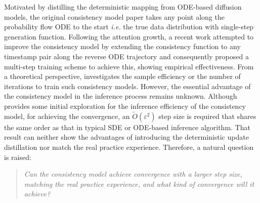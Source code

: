 \documentclass[11pt]{article}
\newcommand{\xh}[1]{\textcolor[HTML]{66CCFF}{#1}}
\begin{document}
Motivated by distilling the deterministic mapping from ODE-based diffusion models,
the original consistency model paper \cite{song2023consistency} takes any point along the probability flow ODE to the start \textit{i.e.} the true data distribution with single-step generation function.
Following the attention growth, a recent work \cite{kim2023consistency} attempted to improve the consistency model by extending the consistency function to any timestamp pair along the reverse ODE trajectory and consequently proposed a multi-step training scheme to achieve this, showing empirical effectiveness. 
From a theoretical perspective, \cite{dou2024theory, li2024towards} investigates the sample efficiency or the number of iterations to train such consistency models.
However, the essential advantage of the consistency model in the inference process remains unknown. 
Although~\cite{lyu2024sampling} provides some initial exploration for the inference efficiency of the consistency model, for achieving the convergence, an $\tilde{O}(\varepsilon^2)$ step size is required that shares the same order as that in typical SDE or ODE-based inference algorithm.
That result can neither show the advantages of introducing the deterministic update distillation nor match the real practice experience. 
Therefore, a natural question is raised:
\begin{quote}
    \emph{Can the consistency model achieve convergence with a larger step size, matching the real practice experience, and what kind of convergence will it achieve?}
\end{quote}
\end{document}
